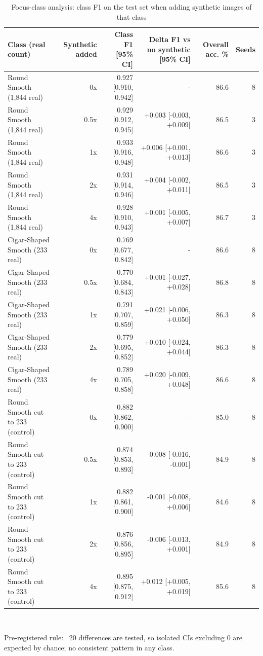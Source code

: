 \begin{table}[t]
\centering
\footnotesize
\caption{Focus-class analysis: class F1 on the test set when adding synthetic images of that class}
\label{tab:t09_focus_classes}
\begin{tabular}{lrrrrr}
\toprule
Class (real count) & Synthetic added & Class F1 [95\% CI] & Delta F1 vs no synthetic [95\% CI] & Overall acc. \% & Seeds \\
\midrule
Round Smooth (1,844 real) & 0x & 0.927 [0.910, 0.942] & - & 86.6 & 8 \\
Round Smooth (1,844 real) & 0.5x & 0.929 [0.912, 0.945] & +0.003 [-0.003, +0.009] & 86.5 & 3 \\
Round Smooth (1,844 real) & 1x & 0.933 [0.916, 0.948] & +0.006 [+0.001, +0.013] & 86.6 & 3 \\
Round Smooth (1,844 real) & 2x & 0.931 [0.914, 0.946] & +0.004 [-0.002, +0.011] & 86.5 & 3 \\
Round Smooth (1,844 real) & 4x & 0.928 [0.910, 0.943] & +0.001 [-0.005, +0.007] & 86.7 & 3 \\
Cigar-Shaped Smooth (233 real) & 0x & 0.769 [0.677, 0.842] & - & 86.6 & 8 \\
Cigar-Shaped Smooth (233 real) & 0.5x & 0.770 [0.684, 0.843] & +0.001 [-0.027, +0.028] & 86.8 & 8 \\
Cigar-Shaped Smooth (233 real) & 1x & 0.791 [0.707, 0.859] & +0.021 [-0.006, +0.050] & 86.3 & 8 \\
Cigar-Shaped Smooth (233 real) & 2x & 0.779 [0.695, 0.852] & +0.010 [-0.024, +0.044] & 86.3 & 8 \\
Cigar-Shaped Smooth (233 real) & 4x & 0.789 [0.705, 0.858] & +0.020 [-0.009, +0.048] & 86.6 & 8 \\
Round Smooth cut to 233 (control) & 0x & 0.882 [0.862, 0.900] & - & 85.0 & 8 \\
Round Smooth cut to 233 (control) & 0.5x & 0.874 [0.853, 0.893] & -0.008 [-0.016, -0.001] & 84.9 & 8 \\
Round Smooth cut to 233 (control) & 1x & 0.882 [0.861, 0.900] & -0.001 [-0.008, +0.006] & 84.6 & 8 \\
Round Smooth cut to 233 (control) & 2x & 0.876 [0.856, 0.895] & -0.006 [-0.013, +0.001] & 84.9 & 8 \\
Round Smooth cut to 233 (control) & 4x & 0.895 [0.875, 0.912] & +0.012 [+0.005, +0.019] & 85.6 & 8 \\
\bottomrule
\end{tabular}
\\[2pt]\parbox{\linewidth}{\scriptsize Pre-registered rule: ~20 differences are tested, so isolated CIs excluding 0 are expected by chance; no consistent pattern in any class.}
\end{table}
